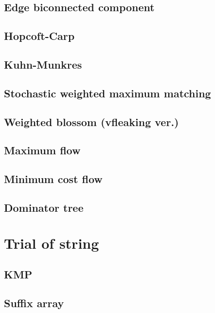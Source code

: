 \documentclass[UTF8,a4paper]{report}
\begin{document}
		\section{Edge biconnected component}
			
		\section{Hopcoft-Carp}
			
		\section{Kuhn-Munkres}
			
		\section{Stochastic weighted maximum matching}
			
		\section{Weighted blossom (vfleaking ver.)}	
			
		\section{Maximum flow}
			
		\section{Minimum cost flow}
			
		\section{Dominator tree}
			
	\chapter{Trial of string}
		\section{KMP}
			
		\section{Suffix array}
			
\end{document}
